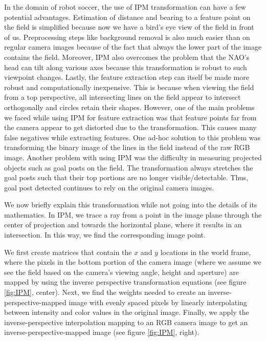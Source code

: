 \documentclass[	DIV=calc,%
							paper=a4,%
							fontsize=9pt,%
							twocolumn]{scrartcl}	 					%
\begin{document}
In the domain of robot soccer, the use of IPM transformation can have a few potential advantages. %
Estimation of distance and bearing to a feature point on the field is simplified because now we have a bird's eye view of the field in front of us. Preprocessing steps like background removal is also much easier than on regular camera images because of the fact that always the lower part of the image contains the field. Moreover, IPM also overcomes the problem that the NAO's head can tilt along various axes because this transformation is robust to such viewpoint changes. Lastly, the feature extraction step can itself be made more robust and computationally inexpensive. This is because when viewing the field from a top perspective, all intersecting lines on the field appear to intersect orthogonally and circles retain their shapes. However, one of the main problems we faced while using IPM for feature extraction was that feature points far from the camera appear to get distorted due to the transformation. This causes many false negatives while extracting features. One ad-hoc solution to this problem was transforming the binary image of the lines in the field instead of the raw RGB image. Another problem with using IPM was the difficulty in measuring projected objects such as goal posts on the field. The transformation always stretches the goal posts such that their top portions are no longer visible/detectable. Thus, goal post detected continues to rely on the original camera images.

We now briefly explain this transformation\cite{IPM} while not going into the details of its mathematics. In IPM, we trace a ray from a point in the image plane through the center of projection and towards the horizontal plane, where it results in an intersection. In this way, we find the corresponding image point.

We first create matrices that contain the $x$ and $y$ locations in the world frame, where the pixels in the bottom portion of the camera image (where we assume we see the field based on the camera's viewing angle, height and aperture) are mapped by using the inverse perspective transformation equations (see figure \ref{fig:IPM}, center). Next, we find the weights needed to create an inverse-perspective-mapped image with evenly spaced pixels by linearly interpolating between intensity and color values in the original image. Finally, we apply the inverse-perspective interpolation mapping to an RGB camera image to get an inverse-perspective-mapped image\cite{IPMCode} (see figure \ref{fig:IPM}, right).
\end{document}
